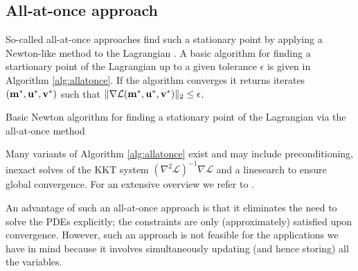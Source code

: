 \documentclass{iopart}
\begin{document}
\subsection{All-at-once approach}
So-called all-at-once approaches find such a stationary point by applying a Newton-like method to the Lagrangian \cite{Haber2000}. A basic algorithm for finding a startionary point of the Lagrangian up to a given tolerance $\epsilon$ is given in Algorithm \ref{alg:allatonce}. If the algorithm converges it returns iterates $(\mathbf{m}^*,\mathbf{u}^*,\mathbf{v}^*)$ such that $\|\nabla \mathcal{L}(\mathbf{m}^*,\mathbf{u}^*,\mathbf{v}^*)\|_2\leq \epsilon$.
%
\begin{algorithm}
\caption{Basic Newton algorithm for finding a stationary point of the Lagrangian via the all-at-once method}
\label{alg:allatonce}
\begin{algorithmic}
\vspace{1mm}
\vspace{1mm}
\STATE{determine steplength $\alpha^k \in (0,1]$}
\vspace{1mm}
\vspace{1mm}
\vspace{1mm}
\ENDWHILE
\end{algorithmic}
\end{algorithm}
%
Many variants of Algorithm \ref{alg:allatonce} exist and may include preconditioning, inexact solves of the KKT system $\left(\nabla^2\mathcal{L}\right)^{-1}\nabla\mathcal{L}$ and a linesearch to ensure global convergence. For an extensive overview we refer to \cite{Herzog2010}.

An advantage of such an all-at-once approach is that it eliminates the need to
solve the PDEs explicitly; the constraints are only (approximately) satisfied upon convergence. However, such an approach is not feasible for the applications we have in mind because it involves simultaneously updating (and hence storing) all the variables.
\end{document}
